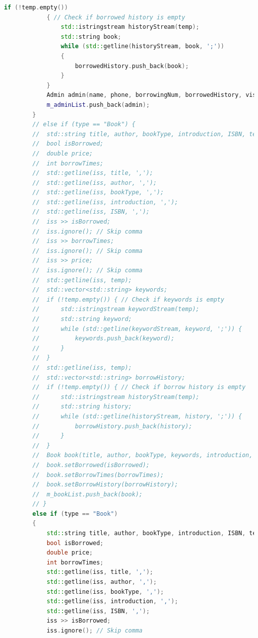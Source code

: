 \documentclass[12pt,twoside]{ctexart}
\begin{document}
\begin{lstlisting}[language=C++]
            if (!temp.empty())
            { // Check if borrowed history is empty
                std::istringstream historyStream(temp);
                std::string book;
                while (std::getline(historyStream, book, ';'))
                {
                    borrowedHistory.push_back(book);
                }
            }
            Admin admin(name, phone, borrowingNum, borrowedHistory, visitNum, authority);
            m_adminList.push_back(admin);
        }
        // else if (type == "Book") {
        //	std::string title, author, bookType, introduction, ISBN, temp;
        //	bool isBorrowed;
        //	double price;
        //	int borrowTimes;
        //	std::getline(iss, title, ',');
        //	std::getline(iss, author, ',');
        //	std::getline(iss, bookType, ',');
        //	std::getline(iss, introduction, ',');
        //	std::getline(iss, ISBN, ',');
        //	iss >> isBorrowed;
        //	iss.ignore(); // Skip comma
        //	iss >> borrowTimes;
        //	iss.ignore(); // Skip comma
        //	iss >> price;
        //	iss.ignore(); // Skip comma
        //	std::getline(iss, temp);
        //	std::vector<std::string> keywords;
        //	if (!temp.empty()) { // Check if keywords is empty
        //		std::istringstream keywordStream(temp);
        //		std::string keyword;
        //		while (std::getline(keywordStream, keyword, ';')) {
        //			keywords.push_back(keyword);
        //		}
        //	}
        //	std::getline(iss, temp);
        //	std::vector<std::string> borrowHistory;
        //	if (!temp.empty()) { // Check if borrow history is empty
        //		std::istringstream historyStream(temp);
        //		std::string history;
        //		while (std::getline(historyStream, history, ';')) {
        //			borrowHistory.push_back(history);
        //		}
        //	}
        //	Book book(title, author, bookType, keywords, introduction, ISBN, price);
        //	book.setBorrowed(isBorrowed);
        //	book.setBorrowTimes(borrowTimes);
        //	book.setBorrowHistory(borrowHistory);
        //	m_bookList.push_back(book);
        // }
        else if (type == "Book")
        {
            std::string title, author, bookType, introduction, ISBN, temp;
            bool isBorrowed;
            double price;
            int borrowTimes;
            std::getline(iss, title, ',');
            std::getline(iss, author, ',');
            std::getline(iss, bookType, ',');
            std::getline(iss, introduction, ',');
            std::getline(iss, ISBN, ',');
            iss >> isBorrowed;
            iss.ignore(); // Skip comma

\end{lstlisting}
\end{document}
